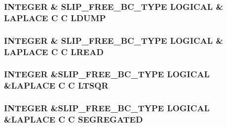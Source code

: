 \hypertarget{flags_8com_a3024fd35afb70c44fa85042b6a14c5ab}{
\subsubsection[{L\-D\-U\-M\-P}]{\setlength{\rightskip}{0pt plus 5cm}I\-N\-T\-E\-G\-E\-R \& {\bf S\-L\-I\-P\-\_\-\-F\-R\-E\-E\-\_\-\-B\-C\-\_\-\-T\-Y\-P\-E} L\-O\-G\-I\-C\-A\-L \& L\-A\-P\-L\-A\-C\-E C C L\-D\-U\-M\-P}}\label{flags_8com_a3024fd35afb70c44fa85042b6a14c5ab}
\hypertarget{flags_8com_aa6fefd93ca36a6424e6e72230960d44c}{
\subsubsection[{L\-R\-E\-A\-D}]{\setlength{\rightskip}{0pt plus 5cm}I\-N\-T\-E\-G\-E\-R \& {\bf S\-L\-I\-P\-\_\-\-F\-R\-E\-E\-\_\-\-B\-C\-\_\-\-T\-Y\-P\-E} L\-O\-G\-I\-C\-A\-L \& L\-A\-P\-L\-A\-C\-E C C L\-R\-E\-A\-D}}\label{flags_8com_aa6fefd93ca36a6424e6e72230960d44c}
\hypertarget{flags_8com_af9eac3cee045cc6d88e08005d02f153c}{
\subsubsection[{L\-T\-S\-Q\-R}]{\setlength{\rightskip}{0pt plus 5cm}I\-N\-T\-E\-G\-E\-R \&{\bf S\-L\-I\-P\-\_\-\-F\-R\-E\-E\-\_\-\-B\-C\-\_\-\-T\-Y\-P\-E} L\-O\-G\-I\-C\-A\-L \&L\-A\-P\-L\-A\-C\-E C C L\-T\-S\-Q\-R}}\label{flags_8com_af9eac3cee045cc6d88e08005d02f153c}
\hypertarget{flags_8com_a130d80cc54a859d28cc70c83f2ea3b16}{
\subsubsection[{S\-E\-G\-R\-E\-G\-A\-T\-E\-D}]{\setlength{\rightskip}{0pt plus 5cm}I\-N\-T\-E\-G\-E\-R \&{\bf S\-L\-I\-P\-\_\-\-F\-R\-E\-E\-\_\-\-B\-C\-\_\-\-T\-Y\-P\-E} L\-O\-G\-I\-C\-A\-L \&L\-A\-P\-L\-A\-C\-E C C S\-E\-G\-R\-E\-G\-A\-T\-E\-D}}\label{flags_8com_a130d80cc54a859d28cc70c83f2ea3b16}
